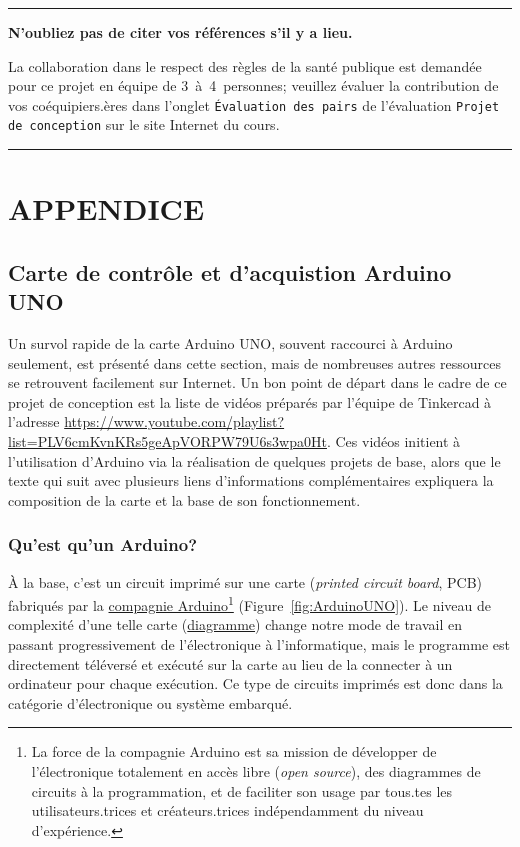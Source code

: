 \documentclass[english,french,12pt]{article}
\begin{document}
\vfill
\hrule
\vspace{0.3em}
\centering
\textbf{N'oubliez pas de citer vos références s'il y a lieu.}\par
\vspace{-0.3em}
La collaboration dans le respect des règles de la santé publique est demandée pour ce projet en équipe de 3~à~4~personnes; veuillez évaluer la contribution de vos coéquipiers.ères dans l'onglet \texttt{Évaluation des pairs} de l'évaluation \texttt{Projet de conception} sur le site Internet du cours.\par
\vspace{1em}
\hrule
\justify

\newpage
%
\section*{APPENDICE}
\label{sec:annexe}

\subsection*{Carte de contrôle et d'acquistion Arduino UNO}
Un survol rapide de la carte Arduino UNO, souvent raccourci à Arduino seulement, est présenté dans cette section, mais de nombreuses autres ressources se retrouvent facilement sur Internet. Un bon point de départ dans le cadre de ce projet de conception est la liste de vidéos préparés par l'équipe de Tinkercad à l'adresse \url{https://www.youtube.com/playlist?list=PLV6cmKvnKRs5geApVORPW79U6s3wpa0Ht}. Ces vidéos initient à l'utilisation d'Arduino via la réalisation de quelques projets de base, alors que le texte qui suit avec plusieurs liens d'informations complémentaires expliquera la composition de la carte et la base de son fonctionnement. 

\subsubsection*{Qu'est qu'un Arduino?}
À la base, c'est un circuit imprimé sur une carte (\textit{printed circuit board}, PCB) fabriqués par la \href{https://www.arduino.cc/}{ compagnie Arduino}\footnote{La force de la compagnie Arduino est sa mission de développer de l'électronique totalement en accès libre (\textit{open source}), des diagrammes de circuits à la programmation, et de faciliter son usage par tous.tes les utilisateurs.trices et créateurs.trices indépendamment du niveau d'expérience.} (Figure~\ref{fig:ArduinoUNO}). Le niveau de complexité d'une telle carte (\href{https://content.arduino.cc/assets/UNO-TH_Rev3e_sch.pdf}{diagramme}) change notre mode de travail en passant progressivement de l'électronique à l'informatique, mais le programme est directement téléversé et exécuté sur la carte au lieu de la connecter à un ordinateur pour chaque exécution. Ce type de circuits imprimés est donc dans la catégorie d'électronique ou système embarqué.
\end{document}

